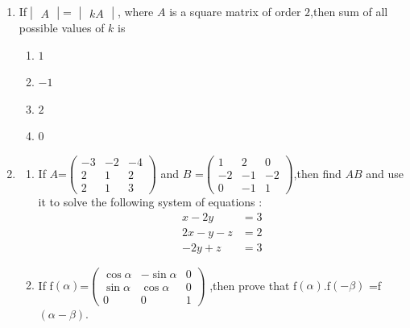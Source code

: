 \documentclass[12pt,-letter paper]{article}\usepackage{siunitx}
\newcommand{\mydet}[1]{\ensuremath{\begin{vmatrix}#1\end{vmatrix}}}
\newcommand{\myvec}[1]{\ensuremath{\begin{pmatrix}#1\end{pmatrix}}}
\providecommand{\mydet}[1]{\ensuremath{\begin{vmatrix}#1\end{vmatrix}}}
\providecommand{\myvec}[1]{\ensuremath{\begin{bmatrix}#1\end{bmatrix}}}
\begin{document}
\begin{enumerate}
\begin{enumerate}[label=(\alph*)]
\end{enumerate}
\item If$\mydet{A} $= $\mydet{ kA}$, where $A$ is a square matrix of order $2$,then sum of all possible values of $k$ is
\begin{enumerate}[label=(\alph*)]
    \item $1$
    \item $-1$
    \item $2$
    \item $0$
\end{enumerate}
\item\begin{enumerate}[label=(\alph*)]
    \item If $A$=$\myvec{ -3 & -2 & -4\\2 & 1 & 2\\2 & 1 & 3}$
and $B$ =$\myvec{  1 & 2 & 0\\-2 & -1 & -2\\0 & -1 & 1}$,then find $AB$ and use it to solve the following system of equations :
\begin{align} x - 2y &= 3\\2x - y - z &= 2\\-2y + z &= 3\end{align}
\item If f\((\alpha)\)=$\myvec{
    \cos\alpha & -\sin\alpha & 0\\
    \sin\alpha & \cos\alpha & 0\\
    0 & 0 & 1}$
 ,then prove that
     f\((\alpha)\).f\((-\beta)\) =f\((\alpha - \beta)\).
\end{enumerate}
 \end{enumerate}
\end{document}
